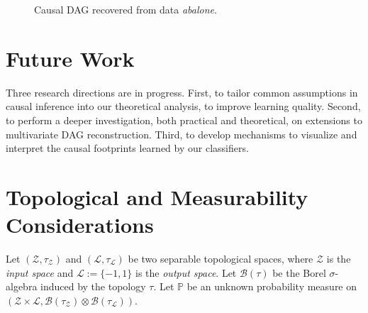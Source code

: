 \documentclass{article}
\newcommand{\Z}{\mathcal{Z}}
\newcommand{\Pio}{\mathbb{P}}
\newcommand{\B}{\mathcal{B}}
\renewcommand{\L}{\mathcal{L}}
\begin{document}
\begin{figure}[h!]
\begin{center}
\end{center}
\caption{Causal DAG recovered from data \emph{abalone}.}
\label{fig:abalone}
\end{figure}

\section{Future Work}\label{sec:discussion}

Three research directions are in progress. First, to tailor common assumptions
in causal inference into our theoretical analysis, to improve learning quality.
Second, to perform a deeper investigation, both practical and theoretical, on
extensions to multivariate DAG reconstruction. Third, to develop mechanisms
to visualize and interpret the causal footprints learned by our classifiers. 

\newpage
\clearpage



\newpage
\clearpage
\onecolumn
\appendix

\section{Topological and Measurability Considerations}\label{sec:measurability}
Let $(\Z, \tau_\Z)$ and $(\L, \tau_\L)$ be two separable topological spaces,
where $\Z$ is the \emph{input space} and $\L := \{-1,1\}$ is the \emph{output
space}.  Let $\B(\tau)$ be the Borel \hbox{$\sigma$-algebra} induced by the
topology $\tau$.  Let $\Pio$ be an unknown probability measure on $(\Z \times
\L,\B(\tau_\Z)\otimes\B(\tau_\L))$. 
\end{document}
